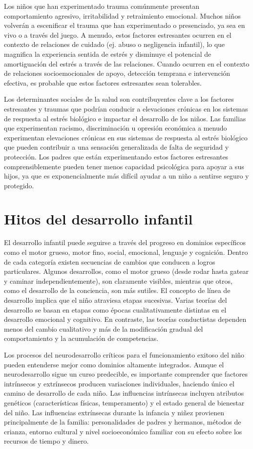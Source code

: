 \documentclass[11pt,letterpaper]{report}
\begin{document}
Los niños que han experimentado trauma comúnmente presentan comportamiento
agresivo, irritabilidad y retraimiento emocional. Muchos niños volverán a
escenificar el trauma que han experimentado o presenciado, ya sea en vivo o a
través del juego. A menudo, estos factores estresantes ocurren en el contexto
de relaciones de cuidado (ej. abuso o negligencia infantil), lo que magnifica la
experiencia sentida de estrés y disminuye el potencial de amortiguación del
estrés a través de las relaciones. Cuando ocurren en el contexto de relaciones
socioemocionales de apoyo, detección temprana e intervención efectiva, es
probable que estos factores estresantes sean tolerables. \cite{Feldman3}

Los determinantes sociales de la salud son contribuyentes clave a los factores
estresantes y traumas que podrían conducir a elevaciones crónicas en los
sistemas de respuesta al estrés biológico e impactar el desarrollo de los
niños. Las familias que experimentan racismo, discriminación u opresión
económica a menudo experimentan elevaciones crónicas en sus sistemas de
respuesta al estrés biológico que pueden contribuir a una sensación
generalizada de falta de seguridad y protección. Los padres que están
experimentando estos factores estresantes comprensiblemente pueden tener menos
capacidad psicológica para apoyar a sus hijos, ya que es exponencialmente más
difícil ayudar a un niño a sentirse seguro y protegido. \cite{Feldman3}

\section{Hitos del desarrollo infantil}
El desarrollo infantil puede seguirse a través del progreso en dominios
específicos como el motor grueso, motor fino, social, emocional, lenguaje y
cognición. Dentro de cada categoría existen secuencias de cambios que conducen
a logros particulares. Algunos desarrollos, como el motor grueso (desde rodar
hasta gatear y caminar independientemente), son claramente visibles, mientras
que otros, como el desarrollo de la conciencia, son más sutiles. El concepto de
línea de desarrollo implica que el niño atraviesa etapas sucesivas. Varias
teorías del desarrollo se basan en etapas como épocas cualitativamente
distintas en el desarrollo emocional y cognitivo. En contraste, las teorías
conductistas dependen menos del cambio cualitativo y más de la modificación
gradual del comportamiento y la acumulación de competencias.
\cite{Nelson19}

Los procesos del neurodesarrollo críticos para el funcionamiento exitoso del
niño pueden entenderse mejor como dominios altamente integrados. Aunque el
neurodesarrollo sigue un curso predecible, es importante comprender que
factores intrínsecos y extrínsecos producen variaciones individuales, haciendo
único el camino de desarrollo de cada niño. Las influencias intrínsecas
incluyen atributos genéticos (características físicas, temperamento) y el
estado general de bienestar del niño. Las influencias extrínsecas durante la
infancia y niñez provienen principalmente de la familia: personalidades de
padres y hermanos, métodos de crianza, entorno cultural y nivel
socioeconómico familiar con su efecto sobre los recursos de tiempo y dinero.
\cite{Gerber2010}
\end{document}
